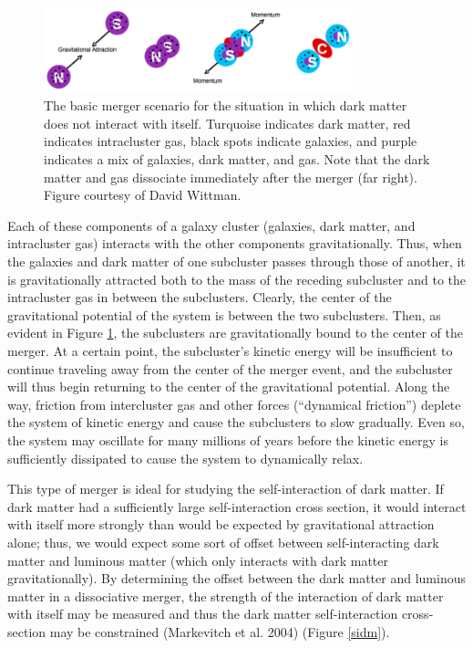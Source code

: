 \documentclass[12 pt]{article}
\renewcommand{\baselinestretch}{2}
\begin{document}
\begin{figure}[h]
\renewcommand{\baselinestretch}{1}
\caption{The basic merger scenario for the situation in which dark matter does not interact with itself. Turquoise indicates dark matter, red indicates intracluster gas, black spots indicate galaxies, and purple indicates a mix of galaxies, dark matter, and gas. Note that the dark matter and gas dissociate immediately after the merger (far right). Figure courtesy of David Wittman.}
\label{cdm}
\centering
\includegraphics[width=0.8\textwidth]{cdm1}
\end{figure}

\renewcommand{\baselinestretch}{1}
Each of these components of a galaxy cluster (galaxies, dark matter, and intracluster gas) interacts with the other components gravitationally. Thus, when the galaxies and dark matter of one subcluster passes through those of another, it is gravitationally attracted both to the mass of the receding subcluster and to the intracluster gas in between the subclusters. Clearly, the center of the gravitational potential of the system is between the two subclusters. Then, as evident in Figure \ref{cdm}, the subclusters are gravitationally bound to the center of the merger. At a certain point, the subcluster's kinetic energy will be insufficient to continue traveling away from the center of the merger event, and the subcluster will thus begin returning to the center of the gravitational potential. Along the way, friction from intercluster gas and other forces (“dynamical friction”) deplete the system of kinetic energy and cause the subclusters to slow gradually. Even so, the system may oscillate for many millions of years before the kinetic energy is sufficiently dissipated to cause the system to dynamically relax.

This type of merger is ideal for studying the self-interaction of dark matter. If dark matter had a sufficiently large self-interaction cross section, it would interact with itself more strongly than would be expected by gravitational attraction alone; thus, we would expect some sort of offset between self-interacting dark matter and luminous matter (which only interacts with dark matter gravitationally). By determining the offset between the dark matter and luminous matter in a dissociative merger, the strength of the interaction of dark matter with itself may be measured and thus the dark matter self-interaction cross-section may be constrained (Markevitch et al. 2004) \cite{Markevitch04} (Figure \ref{sidm}).
\end{document}
